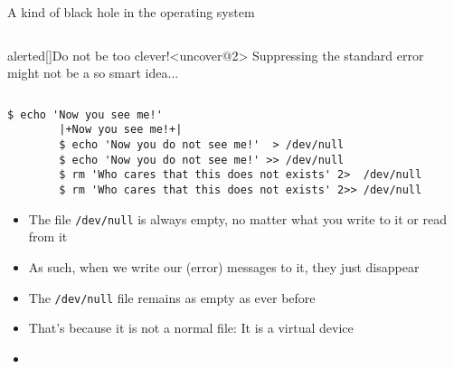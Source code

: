 \begin{frame}[fragile]{A kind of black hole in the operating system}
    \vspace{-9mm}
    \begin{columns}[c]
        \begin{column}{0.7\textwidth}
            \begin{varblock}{alerted}[\textwidth]{Do not be too clever!}<uncover@2>
                Suppressing the standard error might not be a so smart idea...
            \end{varblock}
        \end{column}
        \begin{column}{0.3\textwidth}
        \end{column}
    \end{columns}
    \bigskip
    \begin{lstlisting}[style=MyBash, numbers=none]
        $ echo 'Now you see me!'
        |+Now you see me!+|
        $ echo 'Now you do not see me!'  > /dev/null
        $ echo 'Now you do not see me!' >> /dev/null
        $ rm 'Who cares that this does not exists' 2>  /dev/null
        $ rm 'Who cares that this does not exists' 2>> /dev/null
    \end{lstlisting}
    \bigskip
    \begin{itemize}
        \item The file \texttt{/dev/null} is always empty, no matter what you write to it or read from it
        \item As such, when we write our (error) messages to it, they just disappear
        \item The \texttt{/dev/null} file remains as empty as ever before
        \item That's because it is not a normal file: It is a virtual device
        \item {}
    \end{itemize}
\end{frame}
